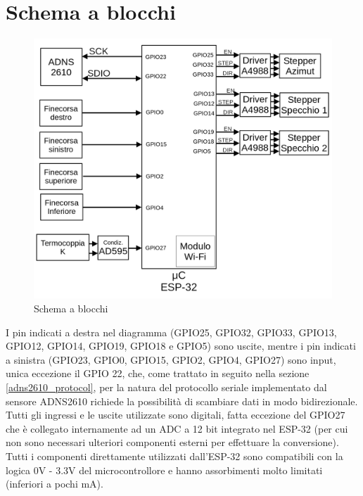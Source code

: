 \documentclass[12pt]{article}
\begin{document}
    \vfill


\section{Schema a blocchi}

\begin{figure}[h]
\centering
    \includegraphics[width=\textwidth-30pt]{Draws/Block_diagram.png}
    \caption{Schema a blocchi}
\end{figure}

I pin indicati a destra nel diagramma (GPIO25, GPIO32, GPIO33, GPIO13, GPIO12, GPIO14, GPIO19, GPIO18 e GPIO5) sono uscite, mentre i pin indicati a sinistra (GPIO23, GPIO0, GPIO15, GPIO2, GPIO4, GPIO27) sono input, unica eccezione il GPIO 22, che, come trattato in seguito nella sezione \ref{adns2610_protocol}, per la natura del protocollo seriale implementato dal sensore ADNS2610 richiede la possibilità di scambiare dati in modo bidirezionale. Tutti gli ingressi e le uscite utilizzate sono digitali, fatta eccezione del GPIO27 che è collegato internamente ad un ADC a 12 bit integrato nel ESP-32 (per cui non sono necessari ulteriori componenti esterni per effettuare la conversione).\\
Tutti i componenti direttamente utilizzati dall'ESP-32 sono compatibili con la lo\-gi\-ca 0V - 3.3V del microcontrollore e hanno assorbimenti molto limitati (inferiori a pochi mA).\\
\end{document}
